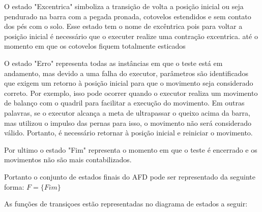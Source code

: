 O estado "Excentrica" simboliza a transição de volta a posição inicial ou seja pendurado na barra com a pegada pronada, cotovelos estendidos e sem contato dos pés com o solo. Esse estado tem o nome de excêntrica pois para voltar a posição inicial é necessário que o executer realize  uma contração excentrica. até o momento em que os cotovelos fiquem totalmente esticados

O estado "Erro" representa todas as instâncias em que o teste está em andamento, mas devido a uma falha do executor, parâmetros são identificados que exigem um retorno à posição inicial para que o movimento seja considerado correto. Por exemplo, isso pode ocorrer quando o executor realiza um movimento de balanço com o quadril para facilitar a execução do movimento. Em outras palavras, se o executor alcança a meta de ultrapassar o queixo acima da barra, mas utilizou o impulso das pernas para isso, o movimento não será considerado válido. Portanto, é necessário retornar à posição inicial e reiniciar o movimento.

Por ultimo o estado "Fim" representa o momento em que o teste é encerrado e os movimentos não são mais contabilizados.

Portanto o conjunto de estados finais do \ac{AFD} pode ser representado da seguinte forma: $F=\{Fim\}$

As funções de transiçoes estão representadas no diagrama de estados a seguir:


